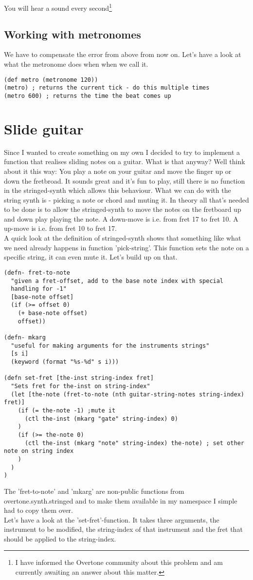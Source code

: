 You will hear a sound every second\footnote{I have informed the Overtone community about this problem and am currently awaiting an answer about this matter.}

\subsection{Working with metronomes}
We have to compensate the error from above from now on. Let's have a look at what the metronome does when when we call it.
\begin{lstlisting}
(def metro (metronome 120))
(metro) ; returns the current tick - do this multiple times
(metro 600) ; returns the time the beat comes up
\end{lstlisting}

\section{Slide guitar}
Since I wanted to create something on my own I decided to try to implement a function that realises sliding notes on a guitar. What is that anyway? Well think about it this way: You play a note on your guitar and move the finger up or down the fretbroad. It sounds great and it's fun to play, still there is no function in the stringed-synth which allows this behaviour. What we can do with the string synth is - picking a note or chord and muting it. In theory all that's needed to be done is to allow the stringed-synth to move the notes on the fretboard up and down play playing the note.
A down-move is i.e. from fret 17 to fret 10. A up-move is i.e. from fret 10 to fret 17.\\

A quick look at the definition of stringed-synth shows that something like what we need already happens in function 'pick-string'. This function sets the note on a specific string, it can even mute it. Let's build up on that.

\begin{lstlisting}
(defn- fret-to-note
  "given a fret-offset, add to the base note index with special
  handling for -1"
  [base-note offset]
  (if (>= offset 0)
    (+ base-note offset)
    offset))

(defn- mkarg
  "useful for making arguments for the instruments strings"
  [s i]
  (keyword (format "%s-%d" s i)))

(defn set-fret [the-inst string-index fret]
  "Sets fret for the-inst on string-index"
  (let [the-note (fret-to-note (nth guitar-string-notes string-index) fret)]
    (if (= the-note -1) ;mute it
      (ctl the-inst (mkarg "gate" string-index) 0)
    )
    (if (>= the-note 0)
      (ctl the-inst (mkarg "note" string-index) the-note) ; set other note on string index
    )
  )
)
\end{lstlisting}
The 'fret-to-note' and 'mkarg' are non-public functions from overtone.synth.stringed and to make them available in my namespace I simple had to copy them over.\\
Let's have a look at the 'set-fret'-function. It takes three arguments, the instrument to be modified, the string-index of that instrument and the fret that should be applied to the string-index.

